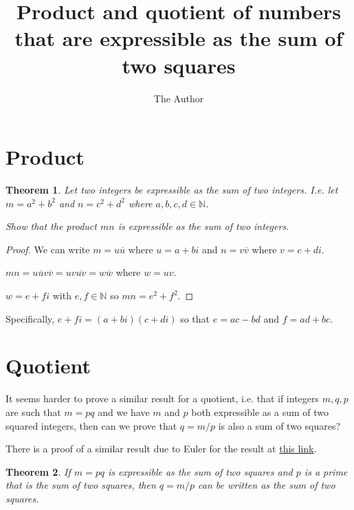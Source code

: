 \documentclass[11pt]{amsart}
\title{Product and quotient of numbers that are expressible as the sum of two squares}
\author{The Author}
\newtheorem{theorem}{Theorem}[section]
\begin{document}
\maketitle

\section{Product}

\begin{theorem}
Let two integers be expressible as the sum of two integers. I.e. let $m = a^2 + b^2$ and $n = c^2 + d^2$ where $a,b,c,d \in \mathbb{N}$.

Show that the product $mn$ is expressible as the sum of two integers.
\end{theorem}

\begin{proof}

We can write $m = u \overline{u}$ where $u = a + b i$ and $n = v \overline{v}$ where $v = c + d i $.

$mn = u \overline{u} v \overline{v} = uv \overline{uv} = w \overline{w}$ where $w = uv$.

$w = e + f i$ with $e,f \in \mathbb{N}$ so $mn = e^2 + f^2$.

\end{proof}

Specifically, $e + f i = (a + b i) ( c + d i)$ so that $e = ac - bd$ and $f = ad + bc$.

\section{Quotient}

It seems harder to prove a similar result for a quotient, i.e. that if integers $m, q, p$ are such that $m = p q$ and we have $m$ and $p$ both expressible as a sum of two squared integers, then can we prove that $q = m / p$ is also a sum of two squares?

There is a proof of a similar result due to Euler for the result
at
\href{http://eulerarchive.maa.org/docs/translations/E228en.pdf}{this link}.

\begin{theorem}
If $m = pq$ is expressible as the sum of two squares and $p$ is a prime that is the sum of two squares, then $q = m / p$ can be written as the sum of two squares.
\end{theorem}
\end{document}
